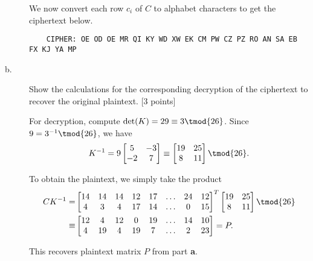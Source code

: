 \documentclass[../hw_sols.tex]{subfiles}
\begin{document}
\begin{description}
\begin{solution}
We now convert each row $c_i$ of $C$ to alphabet characters to get the 
ciphertext below.
\begin{verbatim}
    CIPHER: OE OD OE MR QI KY WD XW EK CM PW CZ PZ RO AN SA EB FX KJ YA MP
\end{verbatim}

\end{solution}


\item[b.] Show the calculations for the corresponding decryption of the 
ciphertext to recover the original plaintext. [3 points]

\begin{solution}

For decryption, compute $\det(K) = 29 \equiv 3 \tmod{26}$. Since 
$9 = 3^{-1} \tmod{26}$, we have
	$$K^{-1} = 9
	\begin{bmatrix} 5 & -3 \\ -2 & 7 \end{bmatrix} 
	\equiv
	\begin{bmatrix} 19 & 25 \\ 8 & 11 \end{bmatrix} 
	\tmod{26}.$$

To obtain the plaintext, we simply take the product	
\begin{align*}
	CK^{-1} =& 
	\begin{bmatrix}
		14 & 14 & 14 & 12 & 17 & \dots & 24 & 12 \\
		4 & 3 & 4 & 17 & 14 & \dots & 0 & 15
	\end{bmatrix}^T
	\begin{bmatrix} 19 & 25 \\ 8 & 11 \end{bmatrix}
	\tmod{26} \\
	\equiv& 
	\begin{bmatrix}
		12 & 4 & 12 & 0 & 19 & \dots & 14 & 10 \\
		4 & 19 & 4 & 19 & 7 & \dots & 2 & 23
	\end{bmatrix}
	= P.
\end{align*}

This recovers plaintext matrix $P$ from part \textbf{a}.

\end{solution}

\end{description}


\newpage


\end{document}
